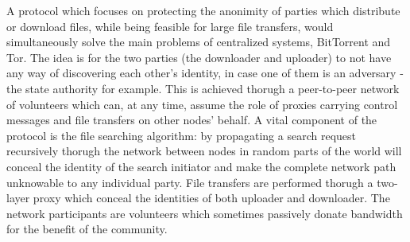 A protocol which focuses on protecting the anonimity of parties which 
distribute or download files, while being feasible for large file transfers, 
would simultaneously solve the main problems of centralized systems, BitTorrent 
and Tor. The idea is for the two parties (the downloader and uploader) to not 
have any way of discovering each other's identity, in case one of them is an 
adversary - the state authority for example. This is achieved thorugh a 
peer-to-peer network of volunteers which can, at any time, assume the role of 
proxies carrying control messages and file transfers on other nodes' behalf. A 
vital component of the protocol is the file searching algorithm: by propagating 
a search request recursively thorugh the network between nodes in random parts 
of the world will conceal the identity of the search initiator and make the 
complete network path unknowable to any individual party. File transfers are 
performed thorugh a two-layer proxy which conceal the identities of both 
uploader and downloader. The network participants are volunteers which 
sometimes passively donate bandwidth for the benefit of the community.
